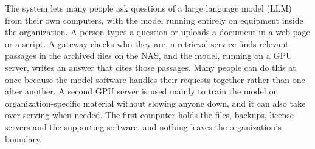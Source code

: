 

The system lets many people ask questions of a large language model (LLM) from their
own computers, with the model running entirely on equipment inside the organization.
A person types a question or uploads a document in a web page or a script. A gateway
checks who they are, a retrieval service finds relevant passages in the archived files
on the NAS, and the model, running on a GPU server, writes an answer that cites those
passages. Many people can do this at once because the model software handles their
requests together rather than one after another. A second GPU server is used mainly to
train the model on organization-specific material without slowing anyone down, and it
can also take over serving when needed. The first computer holds the files, backups,
license servers and the supporting software, and nothing leaves the organization's
boundary.


